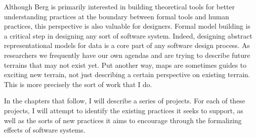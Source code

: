 Although Berg is primarily interested in building theoretical tools for better understanding practices at the boundary between formal tools and human practices, this perspective is also valuable for designers. Formal model building is a critical step in designing any sort of software system. Indeed, designing abstract representational models for data is a core part of any software design process.  As researchers we frequently have our own agendas and are trying to describe future terrains that may not exist yet. Put another way, maps are sometimes guides to exciting new terrain, not just describing a certain perspective on existing terrain. This is more precisely the sort of work that I do.

In the chapters that follow, I will describe a series of projects. For each of these projects, I will attempt to identify the existing practices it seeks to support, as well as the sorts of new practices it aims to encourage through the formalizing effects of software systems.


% 
% 
